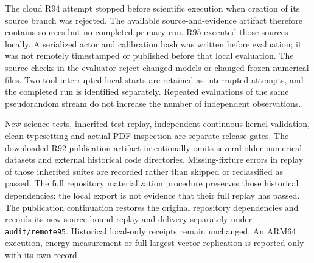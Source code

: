The cloud R94 attempt stopped before scientific execution when creation of its source branch was rejected. The available source-and-evidence artifact therefore contains sources but no completed primary run. R95 executed those sources locally. A serialized actor and calibration hash was written before evaluation; it was not remotely timestamped or published before that local evaluation. The source checks in the evaluator reject changed models or changed frozen numerical files. Two tool-interrupted local starts are retained as interrupted attempts, and the completed run is identified separately. Repeated evaluations of the same pseudorandom stream do not increase the number of independent observations.

New-science tests, inherited-test replay, independent continuous-kernel validation, clean typesetting and actual-PDF inspection are separate release gates. The downloaded R92 publication artifact intentionally omits several older numerical datasets and external historical code directories. Missing-fixture errors in replay of those inherited suites are recorded rather than skipped or reclassified as passed. The full repository materialization procedure preserves those historical dependencies; the local export is not evidence that their full replay has passed. The publication continuation restores the original repository dependencies and records its new source-bound replay and delivery separately under \texttt{audit/remote95}. Historical local-only receipts remain unchanged. An ARM64 execution, energy measurement or full largest-vector replication is reported only with its own record.
